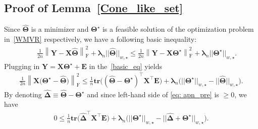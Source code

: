\documentclass[alpha-refs]{wiley-article}
\begin{document}
\subsection{Proof of Lemma~\ref{Cone_like_set}}
Since $\widehat{\boldsymbol{\Theta}}$ is a minimizer and $\boldsymbol{\Theta^{\star}}$ is a feasible solution of the optimization problem in~\eqref{WMVR} respectively, we have a following basic inequality:
\begin{eqnarray} \label{basic_eq}
    & & \frac{1}{2n} \left\| \boldsymbol{Y}-\boldsymbol{X}\boldsymbol{\widehat{\Theta}} \right\|_{\text{F}}^{2} + \boldsymbol{\lambda}_{n}||\widehat{\boldsymbol{\Theta}}||_{w,\star} \leq \frac{1}{2n}\left\| \boldsymbol{Y}-\boldsymbol{X}\boldsymbol{\Theta^{\star}} \right\|_{\text{F}}^{2} + \boldsymbol{\lambda}_{n}||\boldsymbol{\Theta^{\star}}||_{w,\star}.
\end{eqnarray}
Plugging in $\boldsymbol{Y}=\boldsymbol{X}\boldsymbol{\Theta^{\star}}+\boldsymbol{E}$ in the~\eqref{basic_eq} yields
\begin{align}
    \frac{1}{2n} \left\| \boldsymbol{X} \big(\boldsymbol{\Theta^{\star}}-\boldsymbol{\widehat{\Theta}}\big) \right\|_{\text{F}}^{2} \leq \frac{1}{n} \textbf{tr}\big( ( \boldsymbol{\widehat{\Theta}} - \boldsymbol{\Theta^{\star}})^{\top} \boldsymbol{X}^{\top}\boldsymbol{E} \big) + 
    \boldsymbol{\lambda}_{n} \big( ||\boldsymbol{\Theta^{\star}}||_{w,\star} - ||\widehat{\boldsymbol{\Theta}}||_{w,\star} \big). \label{eq: apn_pre}
\end{align}
By denoting $\boldsymbol{\widehat{\Delta}} \equiv \widehat{\boldsymbol{\Theta}} - \boldsymbol{\Theta^{\star}} $ and since left-hand side of \eqref{eq: apn_pre} is $\geq 0$, we have 
\begin{eqnarray}
    0 \leq \frac{1}{n} \textbf{tr}\big( \boldsymbol{\widehat{\Delta}}^{\top} \boldsymbol{X}^{\top}\boldsymbol{E} \big) + \boldsymbol{\lambda}_{n}\big( ||\boldsymbol{\Theta^{\star}}||_{w,\star} - ||\boldsymbol{\widehat{\Delta}} + \boldsymbol{\Theta^{\star}}||_{w,\star} \big).  \label{eq: apn_main}
\end{eqnarray}
\end{document}
